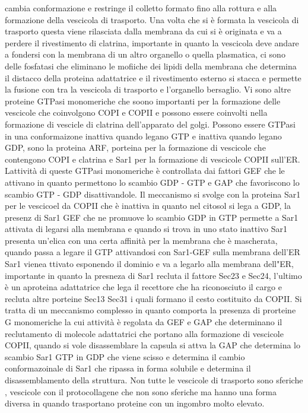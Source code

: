 cambia conformazione e restringe il colletto formato fino alla rottura e alla formazione della vescicola di trasporto. Una volta che si \`e formata la vescicola di trasporto questa 
viene rilasciata dalla membrana da cui si \`e originata e va a perdere il rivestimento di clatrina, importante in quanto la vescicola deve andare a fondersi con la membrana di un altro 
organello o quella plasmatica, ci sono delle fosfatasi che eliminano le mofiiche dei lipidi della membrana che determina il distacco della proteina adattatrice e il rivestimento esterno
si stacca e permette la fusione con tra la vescicola di trasporto e l'organello bersaglio. Vi sono altre proteine GTPasi monomeriche che soono importanti per la formazione delle
vescicole che coinvolgono COPI e COPII e possono essere coinvolti nella formazione di vescicle di clatrina dell'apparato del golgi. Possono essere GTPasi in una conformaizone inattiva
quando legano GTP e inattiva quando legano GDP, sono la proteina ARF, porteina per la formazione di vescicole che contengono COPI e clatrina e Sar1 per la formazione di vescicole COPII
sull'ER. Lattivit\`a di queste GTPasi monomeriche \`e controllata dai fattori GEF che le attivano in quanto permettono lo scambio GDP - GTP e GAP che favoriscono lo scambio GTP - GDP
disattivandole. Il meccanismo si svolge con la proteina Sar1 per le vescicoel da COPII che \`e inattiva in quanto nel citosol si lega a GDP, la presenz di Sar1 GEF che ne promuove lo 
scambio GDP in GTP permette a Sar1 attivata di legarsi alla membrana e quando si trova in uno stato inattivo Sar1 presenta un'elica con una certa affinit\`a per la membrana che \`e 
mascherata, quando passa a legare il GTP attivandosi con Sar1-GEF sulla membrana dell'ER Sar1 vienea ttivato esponendo il dominio e va a legarlo alla membrana dell"ER, importante in 
quanto la presneza di Sar1 recluta il fattore Sec23 e Sec24, l'ultimo \`e un aproteina adattatrice che lega il recettore che ha riconosciuto il cargo e recluta altre porteine Sec13 
Sec31 i quali formano il cesto costituito da COPII. Si tratta di un meccanismo complesso in quanto comporta la presenza di prorteine G monomeriche la cui attivit\`a \`e regolata da
GEF e GAP che determinano il reclutamento di molecole adattatrici che portano alla formazione di vescicole COPII, quando si vole disassemblare la capsula si attva la GAP che determina 
lo scambio Sar1 GTP in GDP che viene scisso e determina il cambio conformazoinale di Sar1 che ripassa in forma solubile e determina il disassemblamento della struttura. Non tutte le 
vescicole di trasporto sono sferiche , vescicole con il protocollagene che non sono sferiche ma hanno una forma diversa in quando trasportano proteine con un ingombro molto elevato. 

